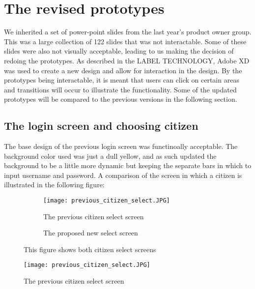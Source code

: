 \section{The revised prototypes}
We inherited a set of power-point slides from the last year's product owner group.
This was a large collection of 122 slides that was not interactable. 
Some of these slides were also not visually acceptable, leading to us making the decision of redoing the prototypes.
As described in the LABEL TECHNOLOGY, Adobe XD was used to create a new design and allow for interaction in the design.
By the prototypes being interactable, it is meant that users can click on certain areas and transitions will occur to illustrate the functionality.
Some of the updated prototypes will be compared to the previous versions in the following section.

\subsection{The login screen and choosing citizen}
The base design of the previous login screen was functinoally acceptable. 
The background color used was just a dull yellow, and as such updated the background to be a little more dynamic but keeping the separate bars in which to input username and password.
A comparison of the screen in which a citizen is illustrated in the following figure:
\begin{figure}[h]
 
    \begin{subfigure}{0.5\textwidth}
    \texttt{[image: previous\_citizen\_select.JPG]} 
    \caption{The previous citizen select screen}
    \label{fig:previous_citizen_select}
    \end{subfigure}
    \begin{subfigure}{0.5\textwidth}
    
    \caption{The proposed new select screen}
    \label{fig:new_citizen_select}
    \end{subfigure}
     
    \caption{This figure shows both citizen select screens}
    \label{fig:citizen_select}
    \end{figure}

\begin{figure}[]
    \texttt{[image: previous\_citizen\_select.JPG]}
    \caption{The previous citizen select screen}
\end{figure}

